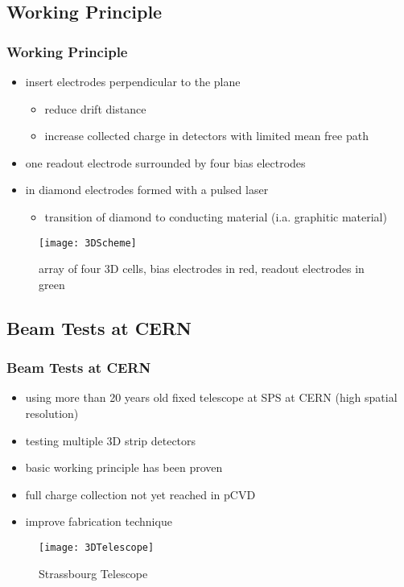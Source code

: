 \subsection{Working Principle}
\begin{frame}
	\frametitle{Working Principle}
	\begin{itemize}
		\setlength{\itemsep}{\fill}
		\item insert electrodes perpendicular to the plane
		\begin{itemize}
			\item reduce drift distance
			\item increase collected charge in detectors with limited mean free path %
		\end{itemize}
		\item one readout electrode surrounded by four bias electrodes
		\item in diamond electrodes formed with a pulsed laser
		\begin{itemize}
			\item transition of diamond to conducting material (i.a. graphitic material)
		\end{itemize}
	\end{itemize}
	\begin{figure}
		\centering
		\texttt{[image: 3DScheme]}
		\caption{array of four 3D cells, bias electrodes in red, readout electrodes in green}
	\end{figure}
\end{frame}
\subsection{Beam Tests at CERN}
\begin{frame}
	\frametitle{Beam Tests at CERN}
	\begin{itemize}
		\setlength{\itemsep}{\fill}
		\item using more than 20 years old fixed telescope at SPS at CERN (high spatial resolution)
		\item testing multiple 3D strip detectors
		\item basic working principle has been proven
		\item full charge collection not yet reached in pCVD
		\item improve fabrication technique
	\end{itemize}
	\begin{figure}
		\centering
		\texttt{[image: 3DTelescope]}
		\caption{Strassbourg Telescope}
	\end{figure}
\end{frame}